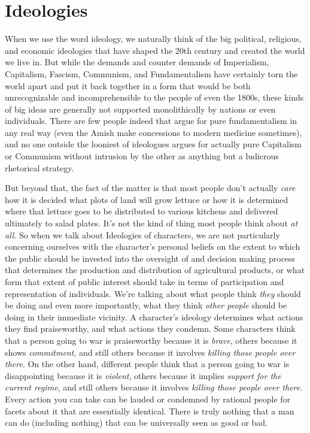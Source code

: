 \section{Ideologies}

When we use the word ideology, we naturally think of the big political, religious, and economic ideologies that have shaped the 20th century and created the world we live in. But while the demands and counter demands of Imperialism, Capitalism, Fascism, Communism, and Fundamentalism have certainly torn the world apart and put it back together in a form that would be both unrecognizable and incomprehensible to the people of even the 1800s, these kinds of big ideas are generally not supported monolithically by nations or even individuals. There are few people indeed that argue for pure fundamentalism in any real way (even the Amish make concessions to modern medicine sometimes), and no one outside the looniest of ideologues argues for actually pure Capitalism or Communism without intrusion by the other as anything but a ludicrous rhetorical strategy.

But beyond that, the fact of the matter is that most people don't actually \textit{care} how it is decided what plots of land will grow lettuce or how it is determined where that lettuce goes to be distributed to various kitchens and delivered ultimately to salad plates. It's not the kind of thing most people think about \textit{at all}. So when we talk about Ideologies of characters, we are not particularly concerning ourselves with the character's personal beliefs on the extent to which the public should be invested into the oversight of and decision making process that determines the production and distribution of agricultural products, or what form that extent of public interest should take in terms of participation and representation of individuals. We're talking about what people think \textit{they} should be doing and even more importantly, what they think \textit{other people} should be doing in their immediate vicinity. A character's ideology determines what actions they find praiseworthy, and what actions they condemn. Some characters think that a person going to war is praiseworthy because it is \textit{brave}, others because it shows \textit{commitment}, and still others because it involves \textit{killing those people over there}. On the other hand, different people think that a person going to war is disappointing because it is \textit{violent}, others because it implies \textit{support for the current regime}, and still others because it involves \textit{killing those people over there}. Every action you can take can be lauded or condemned by rational people for facets about it that are essentially identical. There is truly nothing that a man can do (including nothing) that can be universally seen as good or bad.

